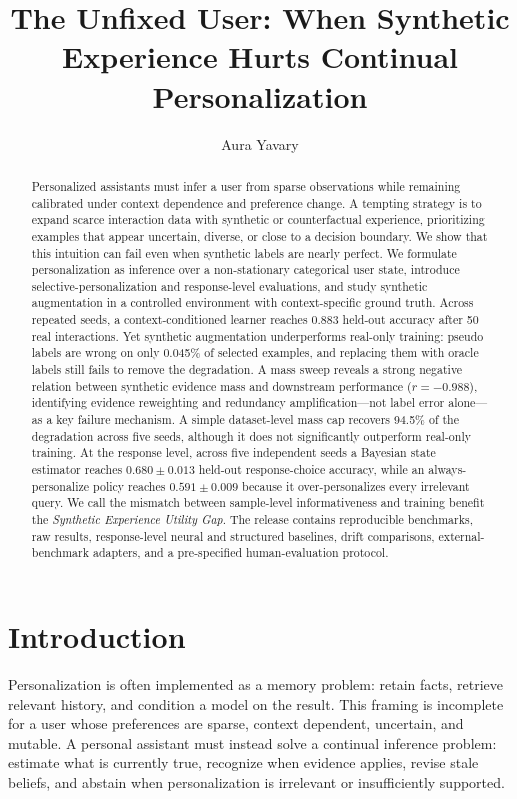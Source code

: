 \documentclass[10pt,twocolumn]{article}
\title{\textbf{The Unfixed User: When Synthetic Experience Hurts Continual Personalization}}
\author{Aura Yavary}
\date{}
\begin{document}
\maketitle
\begin{abstract}
Personalized assistants must infer a user from sparse observations while remaining calibrated under context dependence and preference change. A tempting strategy is to expand scarce interaction data with synthetic or counterfactual experience, prioritizing examples that appear uncertain, diverse, or close to a decision boundary. We show that this intuition can fail even when synthetic labels are nearly perfect. We formulate personalization as inference over a non-stationary categorical user state, introduce selective-personalization and response-level evaluations, and study synthetic augmentation in a controlled environment with context-specific ground truth. Across repeated seeds, a context-conditioned learner reaches 0.883 held-out accuracy after 50 real interactions. Yet synthetic augmentation underperforms real-only training: pseudo labels are wrong on only 0.045\% of selected examples, and replacing them with oracle labels still fails to remove the degradation. A mass sweep reveals a strong negative relation between synthetic evidence mass and downstream performance ($r=-0.988$), identifying evidence reweighting and redundancy amplification---not label error alone---as a key failure mechanism. A simple dataset-level mass cap recovers 94.5\% of the degradation across five seeds, although it does not significantly outperform real-only training. At the response level, across five independent seeds a Bayesian state estimator reaches $0.680\pm0.013$ held-out response-choice accuracy, while an always-personalize policy reaches $0.591\pm0.009$ because it over-personalizes every irrelevant query. We call the mismatch between sample-level informativeness and training benefit the \emph{Synthetic Experience Utility Gap}. The release contains reproducible benchmarks, raw results, response-level neural and structured baselines, drift comparisons, external-benchmark adapters, and a pre-specified human-evaluation protocol.
\end{abstract}

\section{Introduction}
Personalization is often implemented as a memory problem: retain facts, retrieve relevant history, and condition a model on the result. This framing is incomplete for a user whose preferences are sparse, context dependent, uncertain, and mutable. A personal assistant must instead solve a continual inference problem: estimate what is currently true, recognize when evidence applies, revise stale beliefs, and abstain when personalization is irrelevant or insufficiently supported.
\end{document}

